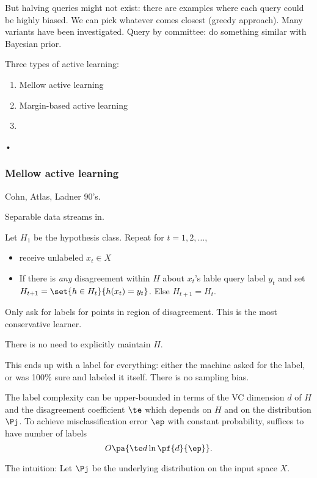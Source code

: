 But halving queries might not exist: there are examples where each query could be highly biased. We can pick whatever comes closest (greedy approach). Many variants have been investigated. Query by committee: do something similar with Bayesian prior.

Three types of active learning:
\begin{enumerate}
\item
Mellow active learning
\item
Margin-based active learning
\item

\end{enumerate}•
\subsubsection{Mellow active learning}
Cohn, Atlas, Ladner 90's.

Separable data streams in. 
\begin{alg}
Let $H_1$ be the hypothesis class.
Repeat for $t=1,2,\ldots$, 
\begin{itemize}
\item
receive unlabeled $x_t\in X$
\item
If there is \emph{any} disagreement within $H$ about $x_t$'s lable query label $y_t$ and set $H_{t+1}=\set{h\in H_t}{h(x_t)=y_t}$.
Else $H_{t+1}=H_t$.
\end{itemize}
\end{alg}
Only ask for labels for points in region of disagreement.
This is the most conservative learner.


There is no need to explicitly maintain $H$.

This ends up with a label for everything: either the machine asked for the label, or was 100$\%$ sure and labeled it itself. There is no sampling bias.

The label complexity can be upper-bounded in terms of the VC dimension $d$ of $H$ and the disagreement coefficient $\te$ which depends on $H$ and on the distribution $\Pj$. 
To achieve misclassification error $\ep$ with constant probability, suffices to have number of labels
$$
O\pa{\te d\ln \pf{d}{\ep}}.
$$

The intuition: Let $\Pj$ be the underlying distribution on the input space $X$. 

